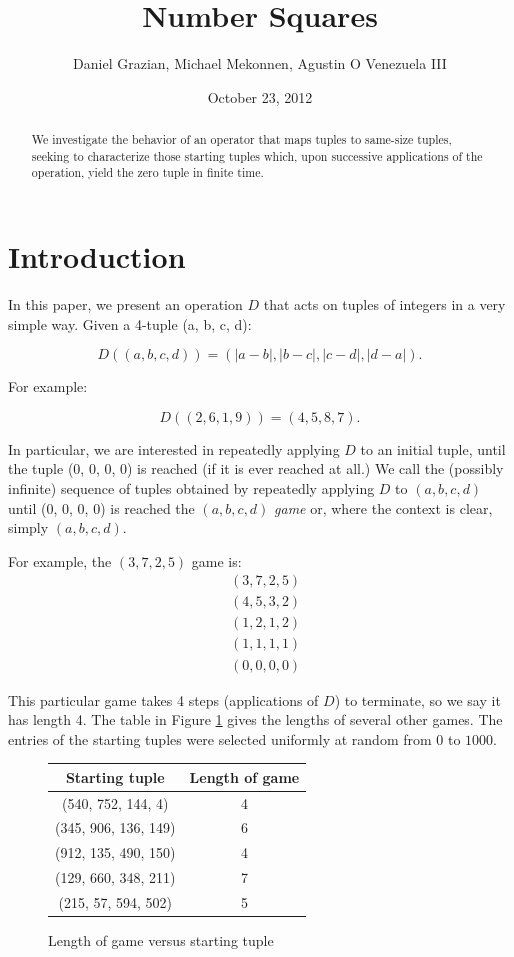 \documentclass[12pt]{amsart}
\title{Number Squares}
\author{Daniel Grazian, Michael Mekonnen, Agustin O Venezuela III}
\date{October 23, 2012}
\newcommand{\diff}{D}
\begin{document}
\begin{abstract}
We investigate the behavior of an operator that maps tuples to same-size tuples, seeking to characterize those starting tuples which, upon successive applications of the operation, yield the zero tuple in finite time.
\end{abstract}

\maketitle

\section{Introduction\label{sec:intro}}

In this paper, we present an operation $\diff$ that acts on tuples of integers in a very simple way. Given a 4-tuple (a, b, c, d):

$$\diff((a, b, c, d)) = (|a - b|, |b - c|, |c - d|, |d - a|).$$ 

For example:

$$\diff((2, 6, 1, 9)) = (4, 5, 8, 7).$$

In particular, we are interested in repeatedly applying $\diff$ to an initial tuple, until the tuple (0, 0, 0, 0) is reached (if it is ever reached at all.) We call the (possibly infinite) sequence of tuples obtained by repeatedly applying $\diff$ to $(a, b, c, d)$ until (0, 0, 0, 0) is reached  the $(a, b, c, d)$ \textit{game} or, where the context is clear, simply $(a, b, c, d)$.

For example, the  $(3, 7, 2, 5)$ game is:
\begin{align*}
& (3, 7, 2, 5) \\
& (4, 5, 3, 2) \\
& (1, 2, 1, 2) \\
& (1, 1, 1, 1) \\
& (0, 0, 0, 0)
\end{align*}

This particular game takes 4 steps (applications of $\diff$) to terminate, so we say it has length 4. The table in Figure \ref{fig: lengthVersusStartingTuple} gives the lengths of several other games. The entries of the starting tuples were selected uniformly at random from $0$ to $1000$.

\begin{figure}
\caption{Length of game versus starting tuple}
\label{fig: lengthVersusStartingTuple}
\begin{center}
    \begin{tabular}{| c | c |}
    \hline
    Starting tuple &  Length of game\\ \hline
    (540, 752, 144, 4) & 4\\ \hline
    (345, 906, 136, 149) & 6\\ \hline
    (912, 135, 490, 150) & 4\\ \hline
    (129, 660, 348, 211) & 7 \\ \hline
    (215, 57, 594, 502) & 5 \\ \hline
    \end{tabular}
\end{center}
\end{figure}
\end{document}
